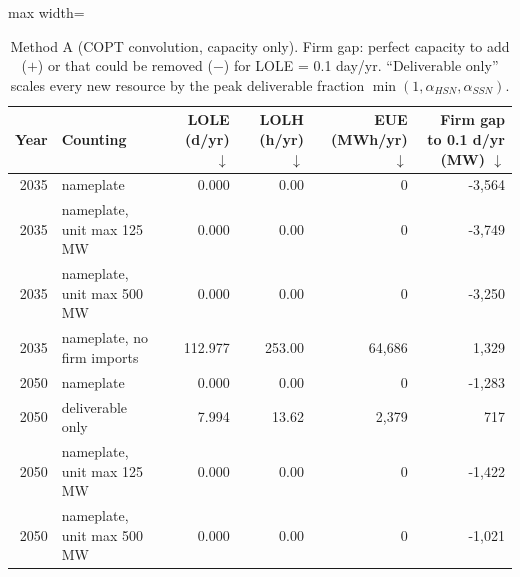\begin{table}[!htbp]
\centering
\scriptsize
\caption{Method A (COPT convolution, capacity only). Firm gap: perfect capacity to add ($+$) or that could be removed ($-$) for LOLE = 0.1 day/yr. \enquote{Deliverable only} scales every new resource by the peak deliverable fraction $\min(1,\alpha_{HSN},\alpha_{SSN})$.}
\label{tab:copt}
\begin{adjustbox}{max width=\linewidth}
\begin{tabular}{rlrrrr}
\toprule
Year & Counting & LOLE (d/yr) $\downarrow$ & LOLH (h/yr) $\downarrow$ & EUE (MWh/yr) $\downarrow$ & Firm gap to 0.1 d/yr (MW) $\downarrow$ \\
\midrule
2035 & nameplate & 0.000 & 0.00 & 0 & -3,564 \\
2035 & nameplate, unit max 125 MW & 0.000 & 0.00 & 0 & -3,749 \\
2035 & nameplate, unit max 500 MW & 0.000 & 0.00 & 0 & -3,250 \\
2035 & nameplate, no firm imports & 112.977 & 253.00 & 64,686 & 1,329 \\
2050 & nameplate & 0.000 & 0.00 & 0 & -1,283 \\
2050 & deliverable only & 7.994 & 13.62 & 2,379 & 717 \\
2050 & nameplate, unit max 125 MW & 0.000 & 0.00 & 0 & -1,422 \\
2050 & nameplate, unit max 500 MW & 0.000 & 0.00 & 0 & -1,021 \\
\bottomrule
\end{tabular}
\end{adjustbox}
\end{table}
